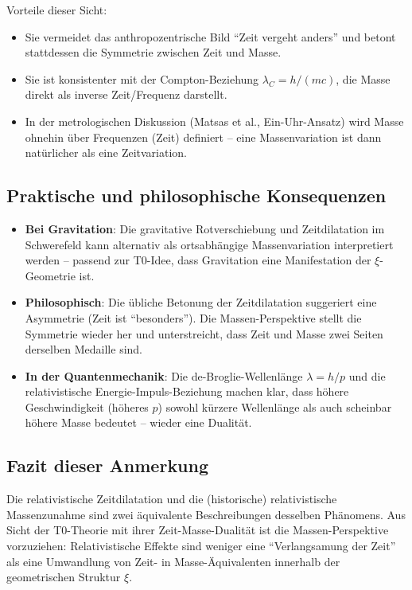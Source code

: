 Vorteile dieser Sicht:
\begin{itemize}
	\item Sie vermeidet das anthropozentrische Bild ``Zeit vergeht anders'' und betont stattdessen die Symmetrie zwischen Zeit und Masse.
	\item Sie ist konsistenter mit der Compton-Beziehung \(\lambda_C = h/(m c)\), die Masse direkt als inverse Zeit/Frequenz darstellt.
	\item In der metrologischen Diskussion (Matsas et al., Ein-Uhr-Ansatz) wird Masse ohnehin über Frequenzen (Zeit) definiert – eine Massenvariation ist dann natürlicher als eine Zeitvariation.
\end{itemize}

\subsection{Praktische und philosophische Konsequenzen}

\begin{itemize}
	\item \textbf{Bei Gravitation}: Die gravitative Rotverschiebung und Zeitdilatation im Schwerefeld kann alternativ als ortsabhängige Massenvariation interpretiert werden – passend zur T0-Idee, dass Gravitation eine Manifestation der \(\xi\)-Geometrie ist.
	\item \textbf{Philosophisch}: Die übliche Betonung der Zeitdilatation suggeriert eine Asymmetrie (Zeit ist ``besonders''). Die Massen-Perspektive stellt die Symmetrie wieder her und unterstreicht, dass Zeit und Masse zwei Seiten derselben Medaille sind.
	\item \textbf{In der Quantenmechanik}: Die de-Broglie-Wellenlänge \(\lambda = h/p\) und die relativistische Energie-Impuls-Beziehung machen klar, dass höhere Geschwindigkeit (höheres \(p\)) sowohl kürzere Wellenlänge als auch scheinbar höhere Masse bedeutet – wieder eine Dualität.
\end{itemize}

\subsection{Fazit dieser Anmerkung}

Die relativistische Zeitdilatation und die (historische) relativistische Massenzunahme sind zwei äquivalente Beschreibungen desselben Phänomens. Aus Sicht der T0-Theorie mit ihrer Zeit-Masse-Dualität ist die Massen-Perspektive vorzuziehen: Relativistische Effekte sind weniger eine ``Verlangsamung der Zeit'' als eine Umwandlung von Zeit- in Masse-Äquivalenten innerhalb der geometrischen Struktur \(\xi\).

